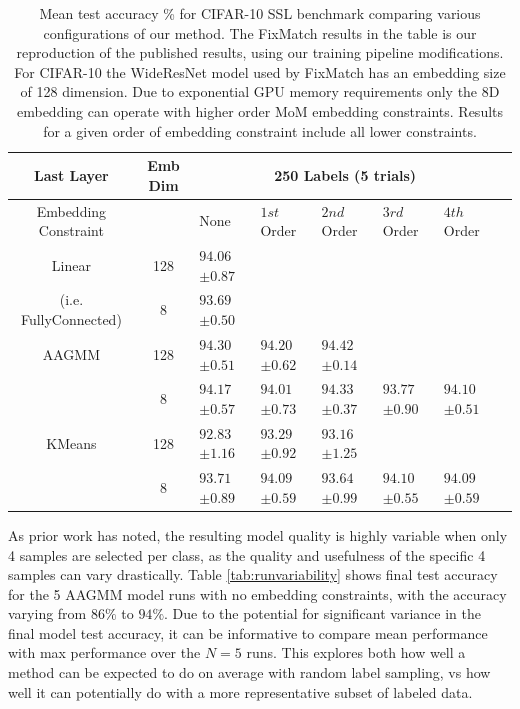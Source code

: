 \documentclass[10pt,twocolumn,letterpaper]{article}
\begin{document}
\begin{table}[ht!]
\begin{tabularx}{\textwidth}{c|c|XXXXXX}
		\hline\hline
		Last Layer  &   Emb Dim  & \multicolumn{5}{c}{250 Labels (5 trials)}            \\ 
		\hline
		\multicolumn{1}{c|}{Embedding Constraint} &  & None & $1st$ Order & $2nd$ Order & $3rd$ Order & $4th$ Order  \\ 
		\hline
		Linear & 128  & $94.06$ \scriptsize{$\pm 0.87$}   &  &  &  &   \\
		(i.e. FullyConnected) & 8  & $93.69$ \scriptsize{$\pm 0.50$}      &  &  &  &   \\
		\hline
		AAGMM & 128  & $94.30$ \scriptsize{$\pm 0.51$}    & $94.20$ \scriptsize{$\pm 0.62$} & $94.42$ \scriptsize{$\pm 0.14$} &  &  \\
		& 8  & $94.17$ \scriptsize{$\pm 0.57$}    & $94.01$ \scriptsize{$\pm 0.73$} & $94.33$ \scriptsize{$\pm 0.37$} & $93.77$ \scriptsize{$\pm 0.90$} & $94.10$ \scriptsize{$\pm 0.51$} \\
		\hline
		KMeans & 128  & $92.83$ \scriptsize{$\pm 1.16$}    & $93.29$ \scriptsize{$\pm 0.92$} & $93.16$ \scriptsize{$\pm 1.25$} &  &  \\
		& 8  & $93.71$ \scriptsize{$\pm 0.89$}    & $94.09$ \scriptsize{$\pm 0.59$} & $93.64$ \scriptsize{$\pm 0.99$} & $94.10$ \scriptsize{$\pm 0.55$} & $94.09$ \scriptsize{$\pm 0.59$}  \\
	\end{tabularx}
	\caption{Mean test accuracy \% for CIFAR-10 SSL benchmark comparing various configurations of our method. The FixMatch results in the table is our reproduction of the published results, using our training pipeline modifications. For CIFAR-10 the WideResNet model used by FixMatch has an embedding size of 128 dimension. Due to exponential GPU memory requirements only the 8D embedding can operate with higher order MoM embedding constraints. Results for a given order of embedding constraint include all lower constraints.}
	\label{table1}
\end{table}

As prior work \cite{sohn2020fixmatch} has noted, the resulting model quality is highly variable when only 4 samples are selected per class, as the quality and usefulness of the specific 4 samples can vary drastically. 
Table \ref{tab:runvariability} shows final test accuracy for the 5 AAGMM model runs with no embedding constraints, with the accuracy varying from $86\%$ to $94\%$.
Due to the potential for significant variance in the final model test accuracy, it can be informative to compare mean performance with max performance over the $N=5$ runs.
This explores both how well a method can be expected to do on average with random label sampling, vs how well it can potentially do with a more representative subset of labeled data.
\end{document}
